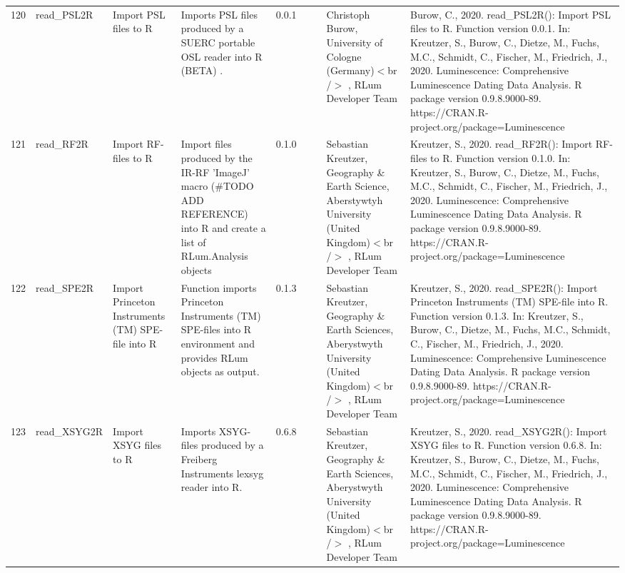 \begin{table}[ht]
\begin{tabular}{rllllllll}
 \\ 
  120 & read\_PSL2R & Import PSL files to R & Imports PSL files produced by a SUERC portable OSL reader into R  (BETA) . & 0.0.1
 &  &  & Christoph Burow, University of Cologne (Germany)$<$br /$>$ , RLum Developer Team & Burow, C., 2020. read\_PSL2R(): Import PSL files to R. Function version 0.0.1. In: Kreutzer, S., Burow, C., Dietze, M., Fuchs, M.C., Schmidt, C., Fischer, M., Friedrich, J., 2020. Luminescence: Comprehensive Luminescence Dating Data Analysis. R package version 0.9.8.9000-89. https://CRAN.R-project.org/package=Luminescence
 \\ 
  121 & read\_RF2R & Import RF-files to R & Import files produced by the IR-RF 'ImageJ' macro (\#TODO ADD REFERENCE) into R and create a list of  RLum.Analysis  objects & 0.1.0
 &  &  & Sebastian Kreutzer, Geography \& Earth Science, Aberstywtyh University (United Kingdom)$<$br /$>$ , RLum Developer Team & Kreutzer, S., 2020. read\_RF2R(): Import RF-files to R. Function version 0.1.0. In: Kreutzer, S., Burow, C., Dietze, M., Fuchs, M.C., Schmidt, C., Fischer, M., Friedrich, J., 2020. Luminescence: Comprehensive Luminescence Dating Data Analysis. R package version 0.9.8.9000-89. https://CRAN.R-project.org/package=Luminescence
 \\ 
  122 & read\_SPE2R & Import Princeton Instruments (TM) SPE-file into R & Function imports Princeton Instruments (TM) SPE-files into R environment and provides  RLum  objects as output. & 0.1.3
 &  &  & Sebastian Kreutzer, Geography \& Earth Sciences, Aberystwyth University (United Kingdom)$<$br /$>$ , RLum Developer Team & Kreutzer, S., 2020. read\_SPE2R(): Import Princeton Instruments (TM) SPE-file into R. Function version 0.1.3. In: Kreutzer, S., Burow, C., Dietze, M., Fuchs, M.C., Schmidt, C., Fischer, M., Friedrich, J., 2020. Luminescence: Comprehensive Luminescence Dating Data Analysis. R package version 0.9.8.9000-89. https://CRAN.R-project.org/package=Luminescence
 \\ 
  123 & read\_XSYG2R & Import XSYG files to R & Imports XSYG-files produced by a Freiberg Instruments lexsyg reader into R. & 0.6.8
 &  &  & Sebastian Kreutzer, Geography \& Earth Sciences, Aberystwyth University (United Kingdom)$<$br /$>$ , RLum Developer Team & Kreutzer, S., 2020. read\_XSYG2R(): Import XSYG files to R. Function version 0.6.8. In: Kreutzer, S., Burow, C., Dietze, M., Fuchs, M.C., Schmidt, C., Fischer, M., Friedrich, J., 2020. Luminescence: Comprehensive Luminescence Dating Data Analysis. R package version 0.9.8.9000-89. https://CRAN.R-project.org/package=Luminescence

\end{tabular}
\end{table}
